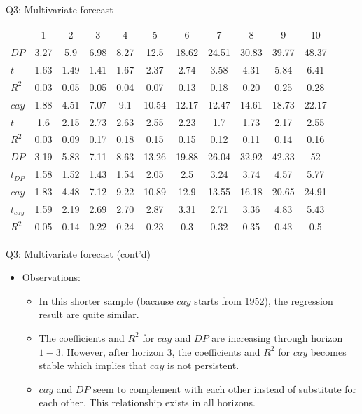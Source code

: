 \documentclass[10pt,t]{beamer}
\begin{document}
\begin{frame}{Q3: Multivariate forecast}
\begin{table}
\footnotesize
\begin{tabular}{lcccccccccc}
\toprule
& 1 & 2 & 3 & 4 & 5 & 6 & 7 & 8 & 9 & 10\\
\cmidrule{1-11}
$DP$ & 3.27 & 5.9 &  6.98 & 8.27 & 12.5 & 18.62 & 24.51 & 30.83 & 39.77 & 48.37 \\
$t$ & 1.63 & 1.49 & 1.41 & 1.67 & 2.37 & 2.74 & 3.58 & 4.31 &5.84 & 6.41 \\
$R^2$ & 0.03 & 0.05 & 0.05 & 0.04 & 0.07 & 0.13 & 0.18 & 0.20 & 0.25 & 0.28 \\
\cmidrule{1-11}
$cay$ & 1.88 & 4.51&  7.07 & 9.1 & 10.54& 12.17 & 12.47 & 14.61 & 18.73 & 22.17 \\
$t$ & 1.6 & 2.15 & 2.73 & 2.63 & 2.55 & 2.23 & 1.7 & 1.73 & 2.17 &2.55 \\
$R^2$ & 0.03 & 0.09 & 0.17 & 0.18 & 0.15 & 0.15 & 0.12 & 0.11 & 0.14 & 0.16 \\
\cmidrule{1-11}
$DP$ & 3.19 & 5.83 & 7.11 & 8.63 & 13.26 & 19.88 & 26.04 & 32.92 & 42.33 & 52 \\
$t_{DP}$ & 1.58 & 1.52 & 1.43 & 1.54 & 2.05 & 2.5 & 3.24 & 3.74 &4.57 & 5.77 \\
$cay$ & 1.83 & 4.48 &  7.12 & 9.22 & 10.89 & 12.9 & 13.55 & 16.18 & 20.65 & 24.91 \\
$t_{cay}$ & 1.59 & 2.19 & 2.69 & 2.70 & 2.87 & 3.31 & 2.71 & 3.36 &4.83 & 5.43 \\
$R^2$ & 0.05 & 0.14 & 0.22 & 0.24 & 0.23 & 0.3 & 0.32 & 0.35 & 0.43 & 0.5 \\
\bottomrule
\end{tabular}
\end{table}
\end{frame}



\begin{frame}{Q3: Multivariate forecast (cont'd)}
\begin{itemize}
  \item Observations:
  \begin{itemize}
    \item In this shorter sample (bacause $cay$ starts from 1952), the regression result are quite similar.
    \item The coefficients and $R^2$ for $cay$ and $DP$ are increasing through horizon $1-3$. However, after horizon $3$, the coefficients and $R^2$ for $cay$ becomes stable which implies that $cay$ is not persistent.
    \item $cay$ and $DP$ seem to complement with each other instead of substitute for each other. This relationship exists in all horizons.
  \end{itemize}
\end{itemize}
\end{frame}
\end{document}
